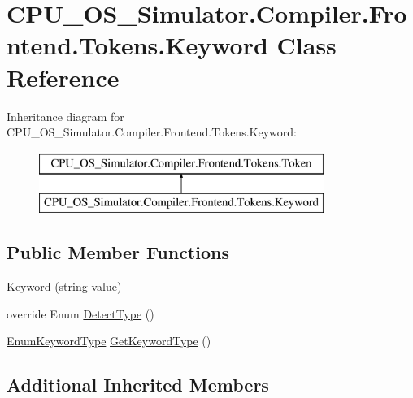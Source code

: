 \hypertarget{class_c_p_u___o_s___simulator_1_1_compiler_1_1_frontend_1_1_tokens_1_1_keyword}{}\section{C\+P\+U\+\_\+\+O\+S\+\_\+\+Simulator.\+Compiler.\+Frontend.\+Tokens.\+Keyword Class Reference}
\label{class_c_p_u___o_s___simulator_1_1_compiler_1_1_frontend_1_1_tokens_1_1_keyword}
Inheritance diagram for C\+P\+U\+\_\+\+O\+S\+\_\+\+Simulator.\+Compiler.\+Frontend.\+Tokens.\+Keyword\+:\begin{figure}[H]
\begin{center}
\leavevmode
\includegraphics[height=2.000000cm]{class_c_p_u___o_s___simulator_1_1_compiler_1_1_frontend_1_1_tokens_1_1_keyword}
\end{center}
\end{figure}
\subsection*{Public Member Functions}
\begin{DoxyCompactItemize}
\item 
\hyperlink{class_c_p_u___o_s___simulator_1_1_compiler_1_1_frontend_1_1_tokens_1_1_keyword_ad01040755e095dc4f415ec2961cee3aa}{Keyword} (string \hyperlink{class_c_p_u___o_s___simulator_1_1_compiler_1_1_frontend_1_1_tokens_1_1_token_a5c05e12850ca18be8cbfdf7e2e263324}{value})
\item 
override Enum \hyperlink{class_c_p_u___o_s___simulator_1_1_compiler_1_1_frontend_1_1_tokens_1_1_keyword_aa1052d5b8b0fa6b1233fac902904e54a}{Detect\+Type} ()
\item 
\hyperlink{namespace_c_p_u___o_s___simulator_1_1_compiler_1_1_frontend_1_1_tokens_a86b87efebad08200cebe3075b5812b13}{Enum\+Keyword\+Type} \hyperlink{class_c_p_u___o_s___simulator_1_1_compiler_1_1_frontend_1_1_tokens_1_1_keyword_aa367b85e134043791bfc3f3f22e2399d}{Get\+Keyword\+Type} ()
\end{DoxyCompactItemize}
\subsection*{Additional Inherited Members}


